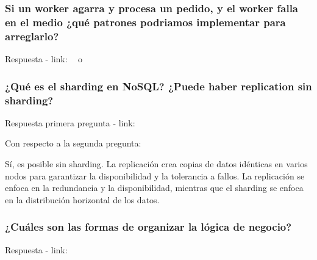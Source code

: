 \documentclass{article}
\begin{document}
  \subsubsection{Si un worker agarra y procesa un pedido, y el worker falla en el medio ¿qué patrones podriamos implementar para arreglarlo?}

  Respuesta - link: \textbf{~} o \textbf{~}


  \subsubsection{¿Qué es el sharding en NoSQL? ¿Puede haber replication sin sharding?}
  Respuesta primera pregunta - link: \textbf{~}
  
  Con respecto a la segunda pregunta: 

  Sí,  es posible sin sharding. La replicación crea copias de datos idénticas en varios nodos para garantizar la disponibilidad y la tolerancia a fallos. La replicación se enfoca en la redundancia y la disponibilidad, mientras que el sharding se enfoca en la distribución horizontal de los datos.



  \subsubsection{¿Cuáles son las formas de organizar la lógica de negocio?}
  Respuesta - link: \textbf{~}
\end{document}
